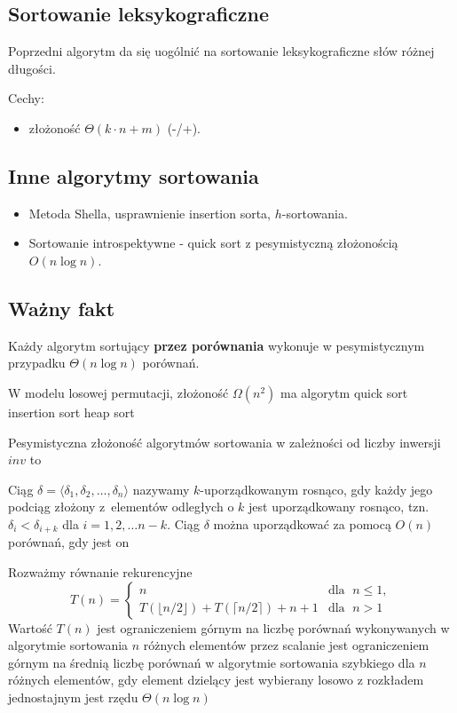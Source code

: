 \subsection{Sortowanie leksykograficzne}
Poprzedni algorytm da się uogólnić na sortowanie leksykograficzne słów różnej długości.

Cechy:
\begin{itemize}
    \item złożoność $\Theta(k \cdot n + m)$ (-/+).
\end{itemize}

\subsection{Inne algorytmy sortowania}
\begin{itemize}
    \item Metoda Shella, usprawnienie insertion sorta, $h$-sortowania.
    \item Sortowanie introspektywne - quick sort z pesymistyczną złożonością $O(n \log n)$.
\end{itemize}

\subsection{Ważny fakt}
Każdy algorytm sortujący \textbf{przez porównania} wykonuje w pesymistycznym przypadku $\Theta(n \log n)$ porównań.


\begin{problems}
    \prob W modelu losowej permutacji, złożoność $\Omega(n^2)$ ma algorytm
    \answers
    {quick sort}
    {insertion sort}
    {heap sort}

    \prob Pesymistyczna złożoność algorytmów sortowania w zależności od liczby inwersji $inv$ to
    
    \prob Ciąg $\delta=\langle\delta_1,\delta_2,\ldots,\delta_n\rangle$ nazywamy $k$-uporządkowanym rosnąco, gdy każdy jego podciąg złożony z~elementów odległych o $k$ jest uporządkowany rosnąco, tzn. $\delta_i<\delta_{i+k}$ dla $i=1,2,\ldots n-k$. Ciąg $\delta$ można uporządkować za pomocą $O(n)$ porównań, gdy jest on
    
    \prob Rozważmy równanie rekurencyjne $$ T(n) = \begin{cases} n & \text{dla }  \; n \leq 1 ,\\ T(\lfloor n/2 \rfloor) + T(\lceil n/2 \rceil ) + n + 1 & \text{dla } \; n > 1 \end{cases} $$
    Wartość $T(n) $
    \answers
    {jest ograniczeniem górnym na liczbę porównań wykonywanych w algorytmie sortowania $n$ różnych elementów przez scalanie}
    {jest ograniczeniem górnym na średnią liczbę porównań w algorytmie sortowania szybkiego dla $n$ różnych elementów, gdy element dzielący jest wybierany losowo z rozkładem jednostajnym}
    {jest rzędu $\Theta (n \log n)$}
\end{problems}

